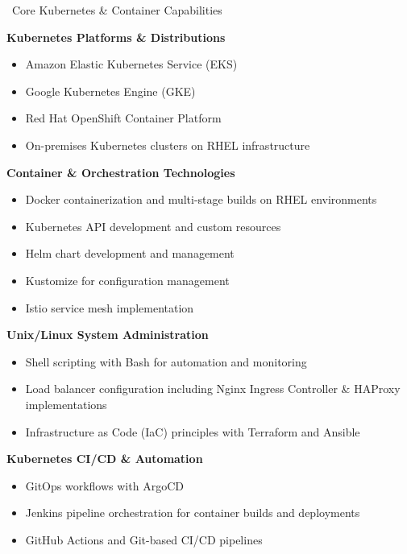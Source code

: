 \documentclass{resume} %
\begin{document}
\begin{rSection}{{\color{sectioncolor}\faCode}\ Core Kubernetes \& Container Capabilities}
\smallbreak

\textbf{Kubernetes Platforms \& Distributions}
\begin{itemize}[leftmargin=2em, nosep]
\item Amazon Elastic Kubernetes Service (EKS) 
\item Google Kubernetes Engine (GKE)
\item Red Hat OpenShift Container Platform
\item On-premises Kubernetes clusters on RHEL infrastructure
\end{itemize}

\textbf{Container \& Orchestration Technologies}
\begin{itemize}[leftmargin=2em, nosep]
\item Docker containerization and multi-stage builds on RHEL environments
\item Kubernetes API development and custom resources
\item Helm chart development and management
\item Kustomize for configuration management
\item Istio service mesh implementation
\end{itemize}

\textbf{Unix/Linux System Administration}
\begin{itemize}[leftmargin=2em, nosep]
\item Shell scripting with Bash for automation and monitoring
\item Load balancer configuration including Nginx Ingress Controller \& HAProxy implementations
\item Infrastructure as Code (IaC) principles with Terraform and Ansible
\end{itemize}

\textbf{Kubernetes CI/CD \& Automation}
\begin{itemize}[leftmargin=2em, nosep]
\item GitOps workflows with ArgoCD
\item Jenkins pipeline orchestration for container builds and deployments
\item GitHub Actions and Git-based CI/CD pipelines
\end{itemize}
\end{rSection}

\end{document}

